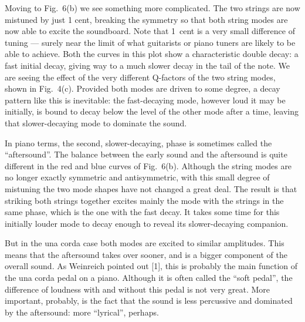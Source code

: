 
  Moving to Fig.\ 6(b) we see something more complicated. The two strings are 
  now mistuned by just 1 cent, breaking the symmetry so that both string modes 
  are now able to excite the soundboard. Note that 1~cent is a very small 
  difference of tuning --- surely near the limit of what guitarists or piano 
  tuners are likely to be able to achieve. Both the curves in this plot show a 
  characteristic double decay: a fast initial decay, giving way to a much 
  slower decay in the tail of the note. We are seeing the effect of the very 
  different Q-factors of the two string modes, shown in Fig.\ 4(c). Provided 
  both modes are driven to some degree, a decay pattern like this is 
  inevitable: the fast-decaying mode, however loud it may be initially, is 
  bound to decay below the level of the other mode after a time, leaving that 
  slower-decaying mode to dominate the sound. 

  In piano terms, the second, slower-decaying, phase is sometimes called the 
  ``aftersound''. The balance between the early sound and the aftersound is 
  quite different in the red and blue curves of Fig.\ 6(b). Although the string 
  modes are no longer exactly symmetric and antisymmetric, with this small 
  degree of mistuning the two mode shapes have not changed a great deal. The 
  result is that striking both strings together excites mainly the mode with 
  the strings in the same phase, which is the one with the fast decay. It takes 
  some time for this initially louder mode to decay enough to reveal its 
  slower-decaying companion. 

  But in the una corda case both modes are excited to similar amplitudes. This 
  means that the aftersound takes over sooner, and is a bigger component of the 
  overall sound. As Weinreich pointed out [1], this is probably the main 
  function of the una corda pedal on a piano. Although it is often called the 
  ``soft pedal'', the difference of loudness with and without this pedal is not 
  very great. More important, probably, is the fact that the sound is less 
  percussive and dominated by the aftersound: more ``lyrical'', perhaps. 

